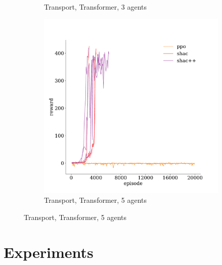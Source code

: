 \begin{figure}[t]
\begin{subfigure}[b]{0.32\textwidth}
        \caption{Transport, Transformer, 3 agents}
        \label{fig:transport-transformer-3}
    \end{subfigure}
    \begin{subfigure}[b]{0.32\textwidth}
        \includegraphics[width=\textwidth]{figs/transport-5-transformer.pdf}
        \caption{Transport, Transformer, 5 agents}
        \label{fig:transport-transformer-5}
    \end{subfigure}

\end{figure}

\section{Experiments}\label{sect:experiments}

